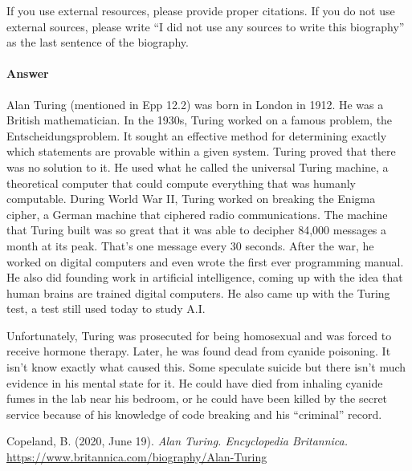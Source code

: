 \documentclass{article}
\begin{document}
If you use external resources, please provide
proper citations. If you do not use external sources, please write ``I did not
use any sources to write this biography'' as the last sentence of the
biography.

\paragraph{Answer}

Alan Turing (mentioned in Epp 12.2) was born in London in 1912. He was a British mathematician. In the 1930s, Turing worked on a famous problem, the Entscheidungsproblem. It sought an effective method for determining exactly which statements are provable within a given system. Turing proved that there was no solution to it. He used what he called the universal Turing machine, a theoretical computer that could compute everything that was humanly computable. During World War II, Turing worked on breaking the Enigma cipher, a German machine that ciphered radio communications. The machine that Turing built was so great that it was able to decipher 84,000 messages a month at its peak. That's one message every 30 seconds. After the war, he worked on digital computers and even wrote the first ever programming manual. He also did founding work in artificial intelligence, coming up with the idea that human brains are trained digital computers. He also came up with the Turing test, a test still used today to study A.I.

Unfortunately, Turing was prosecuted for being homosexual and was forced to receive hormone therapy. Later, he was found dead from cyanide poisoning. It isn't know exactly what caused this. Some speculate suicide but there isn't much evidence in his mental state for it. He could have died from inhaling cyanide fumes in the lab near his bedroom, or he could have been killed by the secret service because of his knowledge of code breaking and his ``criminal'' record.

Copeland, B. (2020, June 19). \textit{Alan Turing. Encyclopedia Britannica.} \url{https://www.britannica.com/biography/Alan-Turing}

% 
% 
\end{document}
